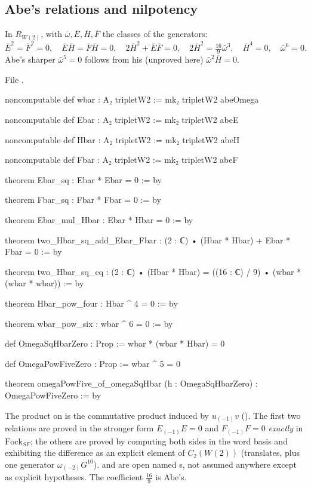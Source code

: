 \subsection{Abe's relations and nilpotency}

\begin{theorem}\label{l18:thm:abeRel}
In $R_{W(2)}$, with $\bar\omega,\bar E,\bar H,\bar F$ the classes of the generators:
\begin{equation*}
\bar E^2=\bar F^2=0,\quad \bar E\bar H=\bar F\bar H=0,\quad 2\bar H^2+\bar E\bar F=0,\quad
2\bar H^2=\tfrac{16}{9}\bar\omega^3,\quad \bar H^4=0,\quad \bar\omega^6=0 .
\end{equation*}
Abe's sharper $\bar\omega^5=0$ follows from his (unproved here) $\bar\omega^2\bar H=0$.
\end{theorem}
\noindent File .
\begin{leancode}
noncomputable def wbar : A₂ tripletW2 := mk₂ tripletW2 abeOmega

noncomputable def Ebar : A₂ tripletW2 := mk₂ tripletW2 abeE

noncomputable def Hbar : A₂ tripletW2 := mk₂ tripletW2 abeH

noncomputable def Fbar : A₂ tripletW2 := mk₂ tripletW2 abeF

theorem Ebar_sq : Ebar * Ebar = 0 := by

theorem Fbar_sq : Fbar * Fbar = 0 := by

theorem Ebar_mul_Hbar : Ebar * Hbar = 0 := by

theorem two_Hbar_sq_add_Ebar_Fbar : (2 : ℂ) • (Hbar * Hbar) + Ebar * Fbar = 0 := by

theorem two_Hbar_sq_eq : (2 : ℂ) • (Hbar * Hbar) = ((16 : ℂ) / 9) • (wbar * (wbar * wbar)) := by

theorem Hbar_pow_four : Hbar ^ 4 = 0 := by

theorem wbar_pow_six : wbar ^ 6 = 0 := by

def OmegaSqHbarZero : Prop := wbar * (wbar * Hbar) = 0

def OmegaPowFiveZero : Prop := wbar ^ 5 = 0

theorem omegaPowFive_of_omegaSqHbar (h : OmegaSqHbarZero) : OmegaPowFiveZero := by
\end{leancode}
\begin{dictionary}
The product \lean{*} on  is the commutative product induced by $u_{(-1)}v$
(). The first two relations are proved in the stronger form $E_{(-1)}E=0$ and $F_{(-1)}F=0$
\emph{exactly} in $\mathrm{Fock}_{SF}$; the others are proved by computing both sides in the word basis and
exhibiting the difference as an explicit element of $C_2(W(2))$ (translates, plus one generator
$\omega_{(-2)}G^{10}$).  and  are open named s, not
assumed anywhere except as explicit hypotheses. The coefficient $\frac{16}9$ is Abe's.
\end{dictionary}
